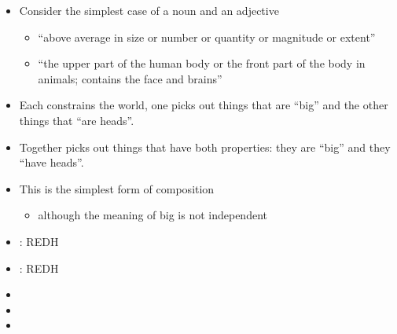 \documentclass[a4paper,landscape,headrule,footrule,xetex]{foils}
\begin{document}
\begin{itemize}
\item Consider the simplest case of a noun and an adjective
  \begin{itemize}
  \item {} ``above average in size or number or quantity or magnitude or extent''
  \item {} ``the upper part of the human body or the front part of the body in animals; contains the face and brains''
  \end{itemize}
\item Each constrains the world, one picks out things that are
  ``big'' and the other things that ``are heads''.
\item Together  picks out things that have both properties: they
  are ``big'' and they ``have heads''.
\end{itemize}
\begin{center}
\end{center}

\begin{itemize}
\item This is the simplest form of composition
  \begin{itemize}
  \item although the meaning of big is not independent
  \end{itemize}
\end{itemize}


\begin{itemize}
\item {}:  REDH
\item {}:  REDH
\item {} 
\item {} 
\item {} 
\end{itemize}
\end{document}

